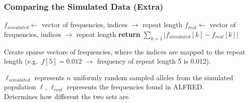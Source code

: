 \documentclass[11pt]{beamer}
\begin{document}
	\begin{frame}
		\frametitle{Comparing the Simulated Data (Extra)}
		\begin{algorithmic}[1]
				\State $f_{simulated} \gets$ vector of frequencies, indices $\rightarrow$ repeat length
				\State $f_{real} \gets$ vector of frequencies, indices $\rightarrow$ repeat length
				\State \textbf{return} $\sum_{k = 1} \left| f_{simulated}[k] - f_{real}[k] \right|$
			\EndFunction
		\end{algorithmic}\bigskip
		Create sparse vectors of frequencies, where the indices are mapped to the repeat length (e.g.\ $f[5] = 0.012$
		$\rightarrow$ frequency of repeat length 5 is 0.012). \\ \medskip

		$\ell_{simulated}$ represents $n$ uniformly random sampled alleles from the simulated population $\ell$,
		$\ell_{real}$ represents the frequencies found in ALFRED. \\ \medskip
		Determines how different the two sets are.
	\end{frame}
\end{document}
